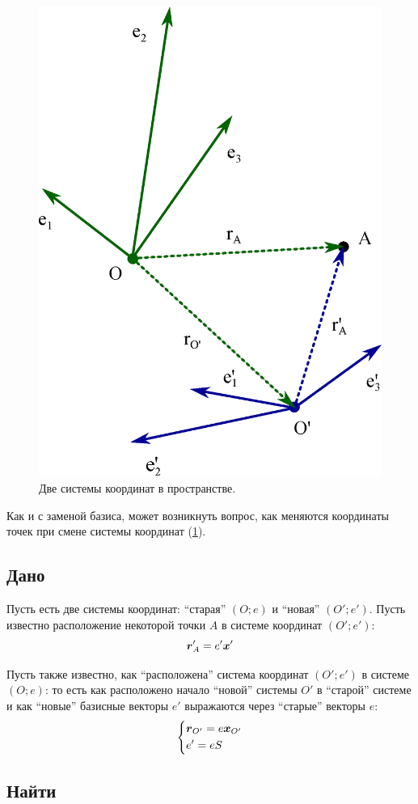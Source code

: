 \documentclass[a4paper,12pt]{article}
\begin{document}
  \begin{figure}[H]
    \centering
    
    \includegraphics[width=0.5\columnwidth]{two-coords}
    
    \caption{Две системы координат в пространстве.}
    \label{fig:two-coords}
  \end{figure}
  
  Как и с заменой базиса, может возникнуть вопрос, как меняются координаты точек при смене системы координат (\ref{fig:two-coords}).
  
  
  \subsection*{Дано}
  
  Пусть есть две системы координат: ``старая'' $(O; e)$ и ``новая'' $(O'; e')$.
  Пусть известно расположение некоторой точки $A$ в системе координат $(O'; e')$:
  \[
    \boldsymbol r'_A = e' \boldsymbol x'
  \]
  
  Пусть также известно, как ``расположена'' система координат $(O'; e')$ в системе $(O; e)$: то есть как расположено начало ``новой'' системы $O'$ в ``старой'' системе и как ``новые'' базисные векторы $e'$ выражаются через ``старые'' векторы $e$:
  \[
    \left\{
      \begin{aligned}
        &\boldsymbol r_{O'} = e \boldsymbol x_{O'}\\
        &e' = e S
      \end{aligned}
    \right.
  \]
  
  
  \subsection*{Найти}
  
\end{document}
